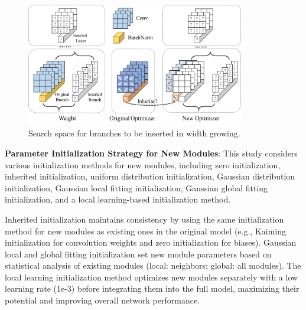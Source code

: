 \documentclass[preprint,12pt]{elsarticle}
\begin{document}
\begin{figure}
  \centering
  \includegraphics[width=0.85\textwidth]{imgs/ini.png}
  \caption{Search space for branches to be inserted in width growing.}
  \label{fig:ini}
\end{figure}

\textbf{Parameter Initialization Strategy for New Modules}: This study considers various initialization methods for new modules, including zero initialization, inherited initialization, uniform distribution initialization, Gaussian distribution initialization, Gaussian local fitting initialization, Gaussian global fitting initialization, and a local learning-based initialization method.

Inherited initialization maintains consistency by using the same initialization method for new modules as existing ones in the original model (e.g., Kaiming initialization for convolution weights and zero initialization for biases). Gaussian local and global fitting initialization set new module parameters based on statistical analysis of existing modules (local: neighbors; global: all modules). The local learning initialization method optimizes new modules separately with a low learning rate (1e-3) before integrating them into the full model, maximizing their potential and improving overall network performance.
\end{document}
